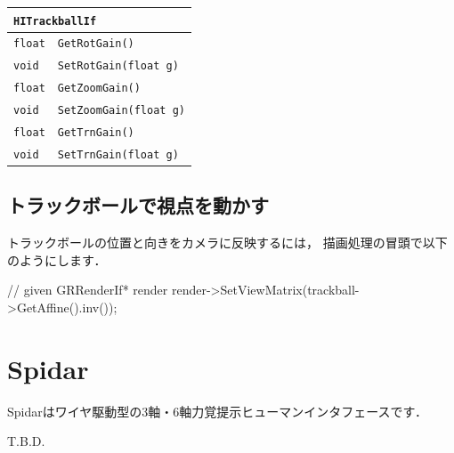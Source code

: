 \begin{center}
\begin{tabular}{p{.15\hsize}p{.75\hsize}}
\multicolumn{2}{l}{\texttt{HITrackballIf}}									\\ \midrule
\texttt{float} 	& \texttt{GetRotGain()}			\\
\texttt{void} 	& \texttt{SetRotGain(float g)}	\\
\texttt{float} 	& \texttt{GetZoomGain()}		\\
\texttt{void} 	& \texttt{SetZoomGain(float g)}	\\
\texttt{float} 	& \texttt{GetTrnGain()}			\\
\texttt{void} 	& \texttt{SetTrnGain(float g)}	\\
\end{tabular}
\end{center}

\subsection*{\KLUDGE トラックボールで視点を動かす}

\KLUDGE トラックボールの位置と向きをカメラに反映するには，
\KLUDGE 描画処理の冒頭で以下のようにします．

\begin{sourcecode}
// given GRRenderIf* render
render->SetViewMatrix(trackball->GetAffine().inv());
\end{sourcecode}

\section{Spidar}

Spidar\KLUDGE はワイヤ駆動型の3\KLUDGE 軸・6\KLUDGE 軸力覚提示ヒューマンインタフェースです．

T.B.D. 


